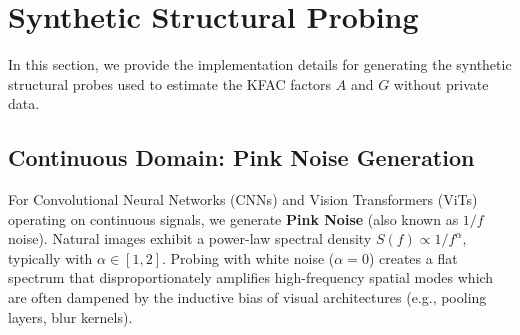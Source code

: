 \documentclass{article}
\theoremstyle{plain}
\theoremstyle{definition}
\theoremstyle{remark}
\begin{document}
\begin{table}[h]
    \centering
    \caption{\textbf{Resource Consumption Analysis.} Comparison of costs for a fixed privacy budget $\epsilon$. $T_{conv}$ denotes steps to convergence. DP-KFC trades linear arithmetic overhead for a reduction in the required optimization steps.}
    \label{tab:complexity}
\end{table}

\section{Synthetic Structural Probing}
\label{app:probing}

In this section, we provide the implementation details for generating the synthetic structural probes used to estimate the KFAC factors $A$ and $G$ without private data.

\subsection{Continuous Domain: Pink Noise Generation}
\label{app:pink_noise}

For Convolutional Neural Networks (CNNs) and Vision Transformers (ViTs) operating on continuous signals, we generate \textbf{Pink Noise} (also known as $1/f$ noise). Natural images exhibit a power-law spectral density $S(f) \propto 1/f^\alpha$, typically with $\alpha \in [1, 2]$. Probing with white noise ($\alpha=0$) creates a flat spectrum that disproportionately amplifies high-frequency spatial modes which are often dampened by the inductive bias of visual architectures (e.g., pooling layers, blur kernels).
\end{document}
